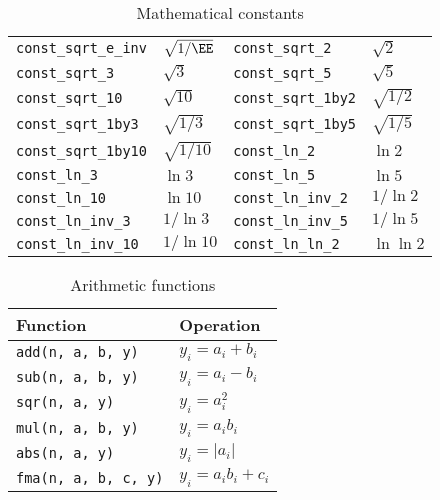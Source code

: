 \begin{table}
\begin{tabularx}{\textwidth}{LLLL}
    \verb|const_sqrt_e_inv|   & $\sqrt{1/\EE}$  &
    \verb|const_sqrt_2|       & $\sqrt{2}$      \\
    \verb|const_sqrt_3|       & $\sqrt{3}$      &
    \verb|const_sqrt_5|       & $\sqrt{5}$      \\
    \verb|const_sqrt_10|      & $\sqrt{10}$     &
    \verb|const_sqrt_1by2|    & $\sqrt{1/2}$    \\
    \verb|const_sqrt_1by3|    & $\sqrt{1/3}$    &
    \verb|const_sqrt_1by5|    & $\sqrt{1/5}$    \\
    \verb|const_sqrt_1by10|   & $\sqrt{1/10}$   &
    \verb|const_ln_2|         & $\ln{2}$        \\
    \verb|const_ln_3|         & $\ln{3}$        &
    \verb|const_ln_5|         & $\ln{5}$        \\
    \verb|const_ln_10|        & $\ln{10}$       &
    \verb|const_ln_inv_2|     & $1/\ln{2}$      \\
    \verb|const_ln_inv_3|     & $1/\ln{3}$      &
    \verb|const_ln_inv_5|     & $1/\ln{5}$      \\
    \verb|const_ln_inv_10|    & $1/\ln{10}$     &
    \verb|const_ln_ln_2|      & $\ln\ln{2}$     \\
    \bottomrule
  \end{tabularx}
  \caption{Mathematical constants}
  \label{tab:Mathematical constants}
\end{table}

\begin{table}
  \begin{tabularx}{\textwidth}{LL}
    \toprule
    Function & Operation \\
    \midrule
    \verb|add(n, a, b, y)|    & $y_i = a_i + b_i$     \\
    \verb|sub(n, a, b, y)|    & $y_i = a_i - b_i$     \\
    \verb|sqr(n, a, y)|       & $y_i = a_i^2$         \\
    \verb|mul(n, a, b, y)|    & $y_i = a_i b_i$       \\
    \verb|abs(n, a, y)|       & $y_i = |a_i|$         \\
    \verb|fma(n, a, b, c, y)| & $y_i = a_i b_i + c_i$ \\
    \bottomrule
  \end{tabularx}
  \caption{Arithmetic functions}
  \label{tab:Arithmetic functions}
\end{table}

